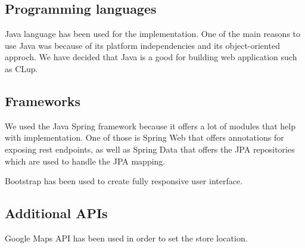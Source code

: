\subsection{Programming languages}

Java language has been used for the implementation.
One of the main reasons to use Java was because of its platform independencies and its object-oriented approch.
We have decided that Java is a good for building web application such as CLup.

\subsection{Frameworks}

We used the Java Spring framework because it offers a lot of modules that help with implementation.
One of those is Spring Web that offers annotations for exposing rest endpoints, as well as Spring Data
that offers the JPA repositories which are used to handle the JPA mapping.

Bootstrap has been used to create fully responsive user interface.

\subsection{Additional APIs}

Google Maps API has been used in order to set the store location.

